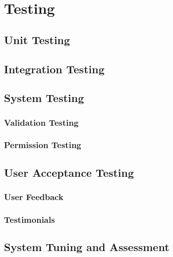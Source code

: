 \chapter{Testing}
\label{Chapter:Testing}

\section{Unit Testing}

\section{Integration Testing}

\section{System Testing}
\subsection{Validation Testing}
\subsection{Permission Testing}

\section{User Acceptance Testing}
\subsection{User Feedback}
\subsection{Testimonials}


\section{System Tuning and Assessment}